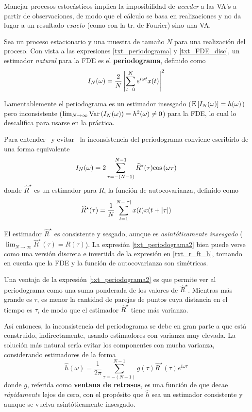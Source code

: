 Manejar 
procesos estocásticos implica la imposibilidad de \textit{acceder} a las VA's a partir de 
observaciones, de modo que el cálculo se basa en realizaciones y no da lugar a un resultado 
\textit{exacto} (como con la tr. de Fourier) sino una VA.

Sea \xt un proceso estacionario y \xtd una muestra de tamaño $N$ para una realización del proceso.
%
Con vista a las expresiones \ref{txt_periodograma} y \ref{txt_FDE_disc},
un estimador \textit{natural} para la FDE es el \textbf{periodograma}, definido como
\begin{equation}
I_N(\omega) = \frac{2}{N} \left| \sum_{t = 0}^{N} e^{i \omega t} x(t) \right|^{2}
\label{txt_periodograma}
\end{equation}

Lamentablemente el periodograma es un estimador 
insesgado ($\mathrm{E}\left[ I_N(\omega) \right]=h(\omega)$) pero 
inconsistente ($\lim_{N\rightarrow\infty} \mathrm{Var}\left( I_N(\omega) \right) = h^{2}(\omega) \neq 0$) para
la FDE, lo cual lo descalifica para usarse en la práctica.

Para entender --y evitar-- la inconsistencia del periodograma conviene escribirlo de una forma
equivalente
\begin{equation}
I_N(\omega) = 2 \sum_{\tau = -(N-1)}^{N-1} \widehat{R}^{\star}(\tau) \mathrm{cos}\left( \omega \tau \right)
\label{txt_periodograma2}
\end{equation}
%
donde $\widehat{R}^{\star}$ es un estimador para $R$, la función de autocovarianza, 
definido como
\begin{equation}
\widehat{R}^{\star} (\tau) = \frac{1}{N} \sum_{t = 1}^{N-\left| \tau \right|} x(t) x(t+\left| \tau \right|)
\end{equation}

El estimador $\widehat{R}^{\star}$ es consistente y sesgado, aunque
es \textit{asintóticamente insesgado} ($\lim_{N\rightarrow \infty} 
\widehat{R}^{\star}(\tau) = R(\tau)$).
%
La expresión \ref{txt_periodograma2} bien puede verse como una versión discreta e invertida de la 
expresión en \ref{txt_r_ft_h}, tomando en cuenta que la FDE y la función de autocovarianza son 
simétricas. 

Una ventaja de la expresión \ref{txt_periodograma2} es que permite ver al periodograma como 
una suma ponderada de los valores de $\widehat{R}^{\star}$. 
Mientras más grande es $\tau$, es menor la cantidad de parejas de puntos cuya distancia en el 
tiempo es $\tau$, de modo que el estimador $\widehat{R}^{\star}$ tiene más varianza. 

Así entonces, la inconsistencia del periodograma se debe en gran parte a que está construido,
indirectamente, usando estimadores con varianza muy elevada.
La solución más natural sería evitar los componentes con mucha varianza, considerando estimadores de 
la forma
%
\begin{equation}
\widehat{h}(\omega) = \frac{1}{2 \pi} \sum_{\tau = -(N-1)}^{N-1} g(\tau) \widehat{R}^{\star}(\tau) 
e^{i \omega \tau} 
\label{txt_estimador}
\end{equation}
%
donde $g$, referida como \textbf{ventana de retrasos}, es una función de que decae 
\textit{rápidamente} lejos de cero, con el propósito que $\widehat{h}$ sea un estimador
consistente y aunque se vuelva asintóticamente insesgado.

